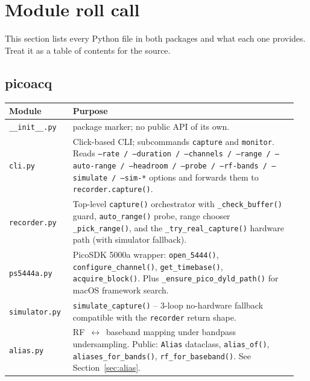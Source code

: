 \documentclass[11pt]{article}
\begin{document}
\section{Module roll call}

This section lists every Python file in both packages and what each
one provides.  Treat it as a table of contents for the source.

\subsection{\textsf{picoacq}}

\begin{tabular}{p{0.21\linewidth}p{0.74\linewidth}}
\toprule
\textbf{Module} & \textbf{Purpose} \\\midrule
\texttt{\_\_init\_\_.py} & package marker; no public API of its own. \\
\texttt{cli.py}   & Click-based CLI; subcommands \texttt{capture} and
                    \texttt{monitor}.  Reads
                    \texttt{--rate / --duration / --channels /
                    --range / --auto-range / --headroom / --probe /
                    --rf-bands / --simulate / --sim-*} options and
                    forwards them to \texttt{recorder.capture()}. \\
\texttt{recorder.py} & Top-level \texttt{capture()} orchestrator with
                    \texttt{\_check\_buffer()} guard,
                    \texttt{auto\_range()} probe, range chooser
                    \texttt{\_pick\_range()}, and the
                    \texttt{\_try\_real\_capture()} hardware path
                    (with simulator fallback). \\
\texttt{ps5444a.py} & PicoSDK 5000a wrapper: \texttt{open\_5444()},
                    \texttt{configure\_channel()},
                    \texttt{get\_timebase()}, \texttt{acquire\_block()}.
                    Plus \texttt{\_ensure\_pico\_dyld\_path()} for
                    macOS framework search. \\
\texttt{simulator.py} & \texttt{simulate\_capture()} -- 3-loop
                    no-hardware fallback compatible with the
                    \texttt{recorder} return shape. \\
\texttt{alias.py}    & RF~$\leftrightarrow$~baseband mapping under
                    bandpass undersampling.  Public:
                    \texttt{Alias} dataclass,
                    \texttt{alias\_of()},
                    \texttt{aliases\_for\_bands()},
                    \texttt{rf\_for\_baseband()}.  See
                    Section~\ref{sec:alias}. \\
\bottomrule
\end{tabular}
\end{document}
